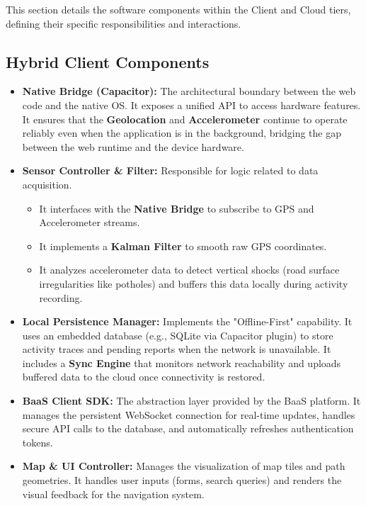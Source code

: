 This section details the software components within the Client and Cloud tiers, defining their specific responsibilities and interactions.

\subsection{Hybrid Client Components}
\begin{itemize}
    \item \textbf{Native Bridge (Capacitor):} The architectural boundary between the web code and the native OS. It exposes a unified API to access hardware features. It ensures that the \textbf{Geolocation} and \textbf{Accelerometer} continue to operate reliably even when the application is in the background, bridging the gap between the web runtime and the device hardware.
    
    \item \textbf{Sensor Controller \& Filter:} Responsible for logic related to data acquisition.
    \begin{itemize}
        \item It interfaces with the \textbf{Native Bridge} to subscribe to GPS and Accelerometer streams.
        \item It implements a \textbf{Kalman Filter} to smooth raw GPS coordinates.
        \item It analyzes accelerometer data to detect vertical shocks (road surface irregularities like potholes) and buffers this data locally during activity recording.
    \end{itemize}
    
    \item \textbf{Local Persistence Manager:} Implements the "Offline-First" capability. It uses an embedded database (e.g., SQLite via Capacitor plugin) to store activity traces and pending reports when the network is unavailable. It includes a \textbf{Sync Engine} that monitors network reachability and uploads buffered data to the cloud once connectivity is restored.
    
    \item \textbf{BaaS Client SDK:} The abstraction layer provided by the BaaS platform. It manages the persistent WebSocket connection for real-time updates, handles secure API calls to the database, and automatically refreshes authentication tokens.
    
    \item \textbf{Map \& UI Controller:} Manages the visualization of map tiles and path geometries. It handles user inputs (forms, search queries) and renders the visual feedback for the navigation system.
\end{itemize}

